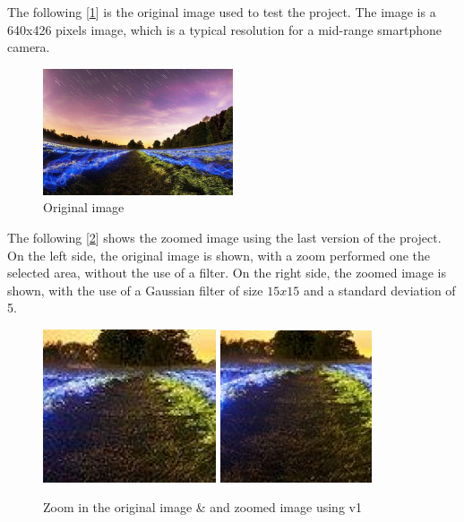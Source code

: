     The following [\ref{fig:original}] is the original image used to test the project. The image is a 640x426 pixels image, which is a typical resolution for a mid-range smartphone camera.
    \begin{figure}[h]
        \centering
        \includegraphics[width=0.5\textwidth]{img/start/sample640x426.jpg}
        \caption{Original image}
        \label{fig:original}
    \end{figure}

    \noindent The following [\ref{fig:zoom}] shows the zoomed image using the last version of the project. 
    On the left side, the original image is shown, with a zoom performed one the selected area, without the use of a filter.
    On the right side, the zoomed image is shown, with the use of a Gaussian filter of size $15x15$ and a standard deviation of 5.

    \begin{figure}[h!]
        \centering
        \includegraphics[width=0.455\textwidth]{img/start/selectedZoneZoom.jpg}
        \includegraphics[width=0.4\textwidth]{img/start/selectedZoneCutout.jpg}
        \caption{Zoom in the original image \& and zoomed image using v1}
        \label{fig:zoom}
    \end{figure}

